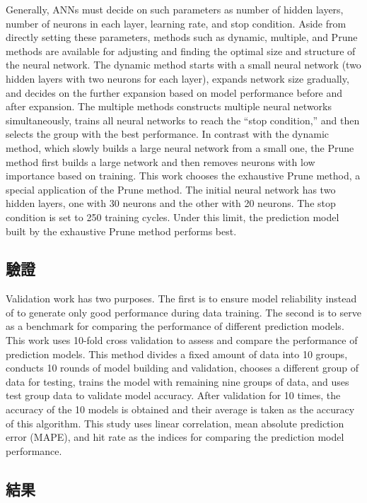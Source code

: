 Generally, ANNs must decide on such parameters as number of hidden layers, number of neurons in each layer, learning rate, and stop condition. Aside from directly setting these parameters, methods such as dynamic, multiple, and Prune methods are available for adjusting and finding the optimal size and structure of the neural network. The dynamic method starts with a small neural network (two hidden layers with two neurons for each layer), expands network size gradually, and decides on the further expansion based on model performance before and after expansion. The multiple methods constructs multiple neural networks simultaneously, trains all neural networks to reach the ``stop condition,'' and then selects the group with the best performance. In contrast with the dynamic method, which slowly builds a large neural network from a small one, the Prune method first builds a large network and then removes neurons with low importance based on training. This work chooses the exhaustive Prune method, a special application of the Prune method. The initial neural network has two hidden layers, one with 30 neurons and the other with 20 neurons. The stop condition is set to 250 training cycles. Under this limit, the prediction model built by the exhaustive Prune method performs best.


\subsection{驗證}

Validation work has two purposes. The first is to ensure model reliability instead of to generate only good performance during data training. The second is to serve as a benchmark for comparing the performance of different prediction models. This work uses 10-fold cross validation to assess and compare the performance of prediction models. This method divides a fixed amount of data into 10 groups, conducts 10 rounds of model building and validation, chooses a different group of data for testing, trains the model with remaining nine groups of data, and uses test group data to validate model accuracy. After validation for 10 times, the accuracy of the 10 models is obtained and their average is taken as the accuracy of this algorithm. This study uses linear correlation, mean absolute prediction error (MAPE), and hit rate as the indices for comparing the prediction model performance.

\subsection{結果}


